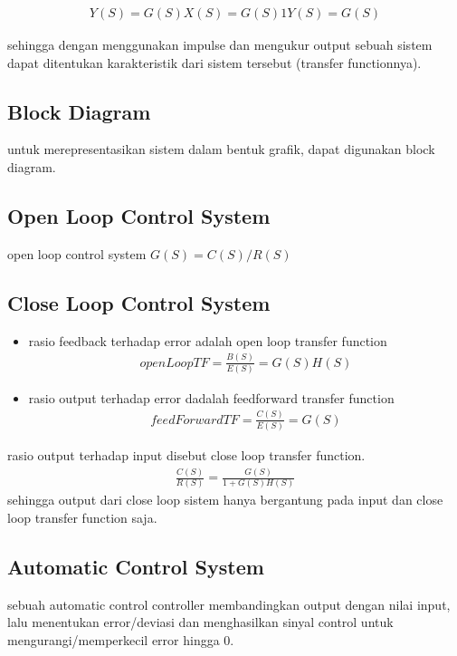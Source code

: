 \begin{gather}
  Y(S)=G(S)X(S)
  = G(S)1
  Y(S)=G(S)
\end{gather}

sehingga dengan menggunakan impulse dan mengukur output sebuah sistem dapat ditentukan karakteristik dari 
sistem tersebut (transfer functionnya).

\pagebreak
\subsection{Block Diagram}
untuk merepresentasikan sistem dalam bentuk grafik, dapat digunakan block diagram.

\subsection{Open Loop Control System}
open loop control system $G(S) = C(S)/R(S)$

\subsection{Close Loop Control System}

\begin{itemize}
  \item rasio feedback terhadap error adalah open loop transfer function \\
    \begin{gather}
      openLoopTF = \frac{B(S)}{E(S)}
      =G(S)H(S)
    \end{gather}

  \item rasio output terhadap error dadalah feedforward transfer function \\
    \begin{gather}
      feedForwardTF = \frac{C(S)}{E(S)}
      =G(S)
    \end{gather}

\end{itemize}

rasio output terhadap input disebut close loop transfer function.
\begin{gather}
  \frac{C(S)}{R(S)} = \frac{G(S)}{1+G(S)H(S)}
\end{gather}
sehingga output dari close loop sistem hanya bergantung pada input dan close loop transfer function saja.


\subsection{Automatic Control System}
sebuah automatic control controller membandingkan output dengan nilai input, lalu menentukan error/deviasi 
dan menghasilkan sinyal control untuk mengurangi/memperkecil error hingga 0.



